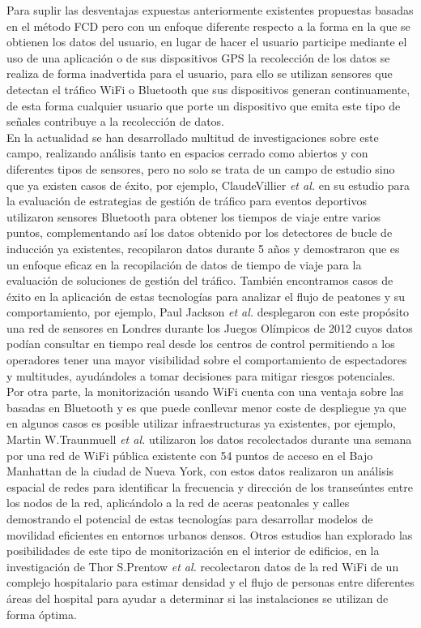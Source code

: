 \documentclass[../proyecto.tex]{subfiles}
\begin{document}
Para suplir las desventajas expuestas anteriormente existentes propuestas basadas en el método FCD pero con un enfoque diferente respecto a la forma en la que se obtienen los datos del usuario, en lugar de hacer el usuario participe mediante el uso de una aplicación o de sus dispositivos GPS la recolección de los datos se realiza de forma inadvertida para el usuario, para ello se utilizan sensores que detectan el tráfico WiFi o Bluetooth que sus dispositivos generan continuamente, de esta forma cualquier usuario que porte un dispositivo que emita este tipo de señales contribuye a la recolección de datos. \\

En la actualidad se han desarrollado multitud de investigaciones sobre este campo, realizando análisis tanto en espacios cerrado como abiertos y con diferentes tipos de sensores, pero no solo se trata de un campo de estudio sino que ya existen casos de éxito, por ejemplo, ClaudeVillier \textit{et al.} en su estudio para la evaluación de estrategias de gestión de tráfico para eventos deportivos \cite{VILLIERS2019100052} utilizaron sensores Bluetooth para obtener los tiempos de viaje entre varios puntos, complementando así los datos obtenido por los detectores de bucle de inducción ya existentes, recopilaron datos durante 5 años y demostraron que es un enfoque eficaz en la recopilación de datos de tiempo de viaje para la evaluación de soluciones de gestión del tráfico. También encontramos casos de éxito en la aplicación de estas tecnologías para analizar el flujo de peatones y su comportamiento, por ejemplo,  Paul Jackson \textit{et al.} \cite{JACKSON2012} desplegaron con este propósito una red de sensores en Londres durante los Juegos Olímpicos de 2012 cuyos datos podían consultar en tiempo real desde los centros de control permitiendo a los operadores tener una mayor visibilidad sobre el comportamiento de espectadores y multitudes, ayudándoles a tomar decisiones para mitigar riesgos potenciales. \\

Por otra parte, la monitorización usando WiFi cuenta con una  ventaja sobre las basadas en Bluetooth y es que puede conllevar menor coste de despliegue ya que en algunos casos es posible utilizar infraestructuras ya existentes, por ejemplo, Martin W.Traunmuell \textit{et al.} \cite{TRAUNMUELLER20184} utilizaron los datos recolectados durante una semana por una red de WiFi pública existente con 54 puntos de acceso en el Bajo Manhattan de la ciudad de Nueva York, con estos datos realizaron un análisis espacial de redes para identificar la frecuencia y dirección de los transeúntes entre los nodos de la red, aplicándolo a la red de aceras peatonales y calles  demostrando el potencial de estas tecnologías para desarrollar modelos de movilidad eficientes en entornos urbanos densos. Otros estudios han explorado las posibilidades de este tipo de monitorización en el interior de edificios, en la investigación de Thor S.Prentow \textit{et al.} \cite{PRENTOW2015305} recolectaron datos de la red WiFi de un complejo hospitalario para estimar densidad y el flujo de personas entre diferentes áreas del hospital para ayudar a determinar si las instalaciones se utilizan de forma óptima.\\
\end{document}
